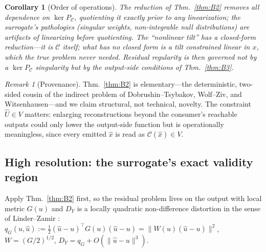 \documentclass[11pt]{article}
\newtheorem{corollary}{Corollary}
\theoremstyle{definition}
\theoremstyle{remark}
\newtheorem*{remark}{Remark}
\newcommand{\PC}{P_{\mathcal{C}}}
\begin{document}
\begin{corollary}[Order of operations]\label{cor:B2b}
The reduction of Thm.~\ref{thm:B2} removes all dependence on $\ker\PC$, quotienting it
\emph{exactly} prior to any linearization; the surrogate's pathologies (singular
weights, non-integrable null distributions) are artifacts of linearizing before
quotienting. The ``nonlinear tilt'' has a closed-form \emph{reduction}---it is
$\mathcal{C}$ itself; what has no closed form is a tilt constrained linear in $x$,
which the true problem never needed. Residual regularity is then governed not by a
$\ker\PC$ singularity but by the output-side conditions of Thm.~\ref{thm:B3}.
\end{corollary}

\begin{remark}[Provenance]
Thm.~\ref{thm:B2} is elementary---the deterministic, two-sided cousin of the indirect
problem of Dobrushin--Tsybakov, Wolf--Ziv, and Witsenhausen---and we claim structural,
not technical, novelty. The constraint $\hat U\in V$ matters: enlarging reconstructions
beyond the consumer's reachable outputs could only lower the output-side function but
is operationally meaningless, since every emitted $\hat x$ is read as
$\mathcal{C}(\hat x)\in V$.
\end{remark}

\subsection{High resolution: the surrogate's exact validity region}

Apply Thm.~\ref{thm:B2} first, so the residual problem lives on the output with local
metric $G(u)$ and $D_Y$ is a locally quadratic non-difference distortion in the sense
of Linder--Zamir \cite{linderzamir1999}: $q_G(u,\hat u):=\tfrac12(\hat u-u)^\top
G(u)(\hat u-u)=\|W(u)(\hat u-u)\|^2$, $W=(G/2)^{1/2}$, $D_Y=q_G+O(\|\hat u-u\|^3)$.
\end{document}
